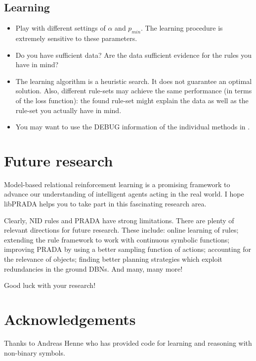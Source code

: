 \documentclass[10pt,twoside,twocolumn,fleqn]{article}
\begin{document}
\subsection{Learning}
\begin{itemize}
\item Play with different settings of $\alpha$ and $p_{min}$. The learning
procedure is extremely sensitive to these parameters.

\item Do you have sufficient data? Are the data sufficient evidence for
the rules you have in mind?

\item The learning algorithm is a heuristic search. It does not guarantee
an optimal solution. Also, different rule-sets may achieve the same
performance (in terms of the loss function): the found rule-set might
explain the data as well as the rule-set you actually have in mind.

\item You may want to use the DEBUG information of the individual methods
in .
\end{itemize}









\section{Future research}

Model-based relational reinforcement learning is a promising framework to
advance our understanding of intelligent agents acting in the real world. I
hope libPRADA helps you to take part in this fascinating research area.

Clearly, NID rules and PRADA have strong limitations. There are plenty of
relevant directions for future research. These include: online learning of
rules; extending the rule framework to work with continuous symbolic
functions; improving PRADA by using a better sampling function of actions;
accounting for the relevance of objects; finding better planning strategies
which exploit redundancies in the ground DBNs. And many, many more!

Good luck with your research!





\section{Acknowledgements}

Thanks to Andreas Henne who has provided code for learning and
reasoning with non-binary symbols.





\end{document}
